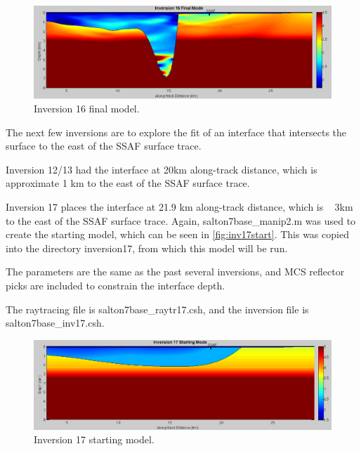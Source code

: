 \documentclass[fontsize=11pt, %
                             paper=a4, %
                             twoside, %
                             captions=tableheading,
                             index=totoc,
                             hyperref]{labbook}
\begin{document}
\begin{addmargin}[4cm]{0cm}
\begin{figure}[h!]
\raggedleft
\includegraphics[scale=0.35,keepaspectratio=true]{figs/Inv16_final.png}
\caption{Inversion 16 final model.}
\label{fig:inv16final}
\end{figure}


The next few inversions are to explore the fit of an interface that intersects the surface to the east of the SSAF surface trace.  

Inversion 12/13 had the interface at 20km along-track distance, which is approximate 1 km to the east of the SSAF surface trace.

Inversion 17 places the interface at 21.9 km along-track distance, which is ~ 3km to the east of the SSAF surface trace.  Again, salton7base\_manip2.m was used to create the starting model, which can be seen in \autoref{fig:inv17start}.  This was copied into the directory inversion17, from which this model will be run.

The parameters are the same as the past several inversions, and MCS reflector picks are included to constrain the interface depth.  

The raytracing file is salton7base\_raytr17.csh, and the inversion file is salton7base\_inv17.csh.  

\begin{figure}[h!]
\raggedleft
\includegraphics[scale=0.4,keepaspectratio=true]{figs/Inv17_0.png}
\caption{Inversion 17 starting model.}
\label{fig:inv17start}
\end{figure}


\end{addmargin}
\end{document}
